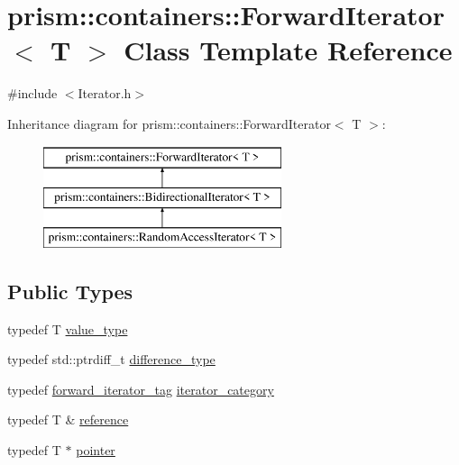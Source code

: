 \hypertarget{classprism_1_1containers_1_1_forward_iterator}{}\section{prism\+:\+:containers\+:\+:Forward\+Iterator$<$ T $>$ Class Template Reference}
\label{classprism_1_1containers_1_1_forward_iterator}


{\ttfamily \#include $<$Iterator.\+h$>$}

Inheritance diagram for prism\+:\+:containers\+:\+:Forward\+Iterator$<$ T $>$\+:\begin{figure}[H]
\begin{center}
\leavevmode
\includegraphics[height=3.000000cm]{classprism_1_1containers_1_1_forward_iterator}
\end{center}
\end{figure}
\subsection*{Public Types}
\begin{DoxyCompactItemize}
\item 
typedef T \hyperlink{classprism_1_1containers_1_1_forward_iterator_a1543170bc355e16a500f376e748f3031}{value\+\_\+type}
\item 
typedef std\+::ptrdiff\+\_\+t \hyperlink{classprism_1_1containers_1_1_forward_iterator_a79680986bd39e3c2f0ab1e008b1150e5}{difference\+\_\+type}
\item 
typedef \hyperlink{structprism_1_1containers_1_1forward__iterator__tag}{forward\+\_\+iterator\+\_\+tag} \hyperlink{classprism_1_1containers_1_1_forward_iterator_aaa8389de2916ab8609f1c92e789d0b92}{iterator\+\_\+category}
\item 
typedef T \& \hyperlink{classprism_1_1containers_1_1_forward_iterator_a4e3141e23f97c87d787c42e5e25cfdf8}{reference}
\item 
typedef T $\ast$ \hyperlink{classprism_1_1containers_1_1_forward_iterator_ad4bc81f412acc7a2d12e592078ed51aa}{pointer}
\end{DoxyCompactItemize}
